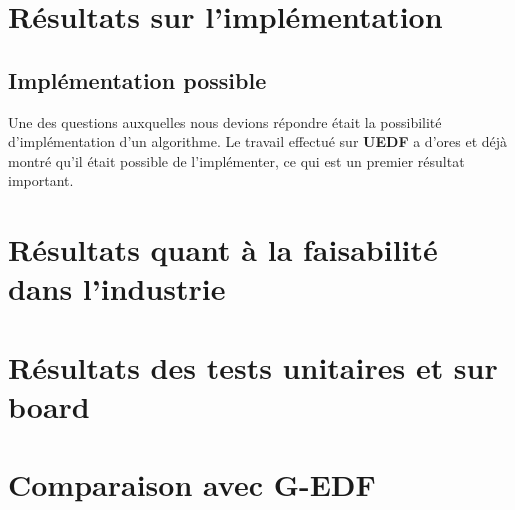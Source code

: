 
\section{Résultats sur l'implémentation}
	\subsection{Implémentation possible}
	
	Une des questions auxquelles nous devions répondre était la possibilité d'implémentation d'un algorithme.
	Le travail effectué sur \textbf{UEDF} a d'ores et déjà montré qu'il était possible de l'implémenter, ce qui est un premier résultat important.\newline
	
	
	

\section{Résultats quant à la faisabilité dans l'industrie}

	

\section{Résultats des tests unitaires et sur board}

	

\section{Comparaison avec G-EDF}
